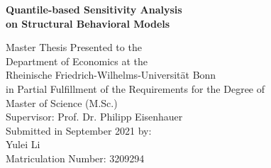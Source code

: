 \begin{titlepage}

\begin{center}

\vspace*{1.0cm}

{\LARGE
\bfseries Quantile-based Sensitivity Analysis \\
\vspace*{0.5cm}
on Structural Behavioral Models
}


{\large
\vspace*{4.0cm}
Master Thesis Presented to the\\
\vspace*{0.25cm}
Department of Economics at the\\
\vspace*{0.25cm}
Rheinische Friedrich-Wilhelms-Universität Bonn\\

\vspace*{2.0cm}
in Partial Fulfillment of the Requirements for the Degree of\\
\vspace*{0.25cm}
Master of Science (M.Sc.)\\

\vspace*{4.0cm}
Supervisor: Prof. Dr. Philipp Eisenhauer\\

\vspace*{2.0cm}
Submitted in September 2021 by:\\
Yulei Li\\
Matriculation Number: 3209294
}

\end{center}

\end{titlepage}
